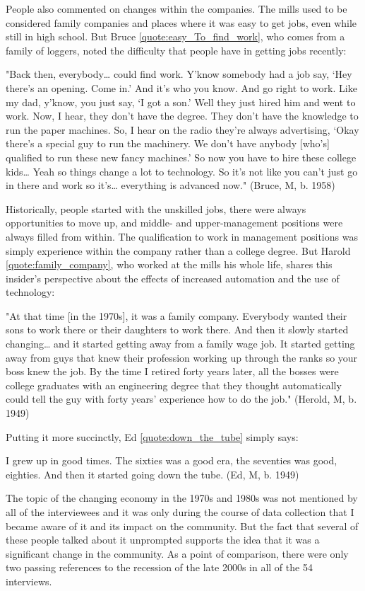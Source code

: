 People also commented on changes within the companies. The mills used to be considered family companies and places where it was easy to get jobs, even while still in high school. But Bruce \ref{quote:easy_To_find_work}, who comes from a family of loggers, noted the difficulty that people have in getting jobs recently:
\begin{num_quote}
    "Back then, everybody… could find work. Y'know somebody had a job say, ‘Hey there's an opening. Come in.' And it's who you know. And go right to work. Like my dad, y'know, you just say, ‘I got a son.' Well they just hired him and went to work. Now, I hear, they don't have the degree. They don't have the knowledge to run the paper machines. So, I hear on the radio they're always advertising, ‘Okay there's a special guy to run the machinery. We don't have anybody [who's] qualified to run these new fancy machines.' So now you have to hire these college kids… Yeah so things change a lot to technology. So it's not like you can't just go in there and work so it's… everything is advanced now." (Bruce, M, b. 1958)
\label{quote:easy_To_find_work}
\end{num_quote}
Historically, people started with the unskilled jobs, there were always opportunities to move up, and middle- and upper-management positions were always filled from within. The qualification to work in management positions was simply experience within the company rather than a college degree. But Harold \ref{quote:family_company}, who worked at the mills his whole life, shares this insider's perspective about the effects of increased automation and the use of technology:
\begin{num_quote}
    "At that time [in the 1970s], it was a family company. Everybody wanted their sons to work there or their daughters to work there. And then it slowly started changing… and it started getting away from a family wage job. It started getting away from guys that knew their profession working up through the ranks so your boss knew the job. By the time I retired forty years later, all the bosses were college graduates with an engineering degree that they thought automatically could tell the guy with forty years' experience how to do the job." (Herold, M, b. 1949)
\label{quote:family_company}
\end{num_quote}
Putting it more succinctly, Ed \ref{quote:down_the_tube} simply says:
\begin{num_quote}
I grew up in good times. The sixties was a good era, the seventies was good, eighties. And then it started going down the tube. (Ed, M, b. 1949)
\label{quote:down_the_tube}
\end{num_quote}
The topic of the changing economy in the 1970s and 1980s was not mentioned by all of the interviewees and it was only during the course of data collection that I became aware of it and its impact on the community. But the fact that several of these people talked about it unprompted supports the idea that it was a significant change in the community. As a point of comparison, there were only two passing references to the recession of the late 2000s in all of the 54 interviews.

